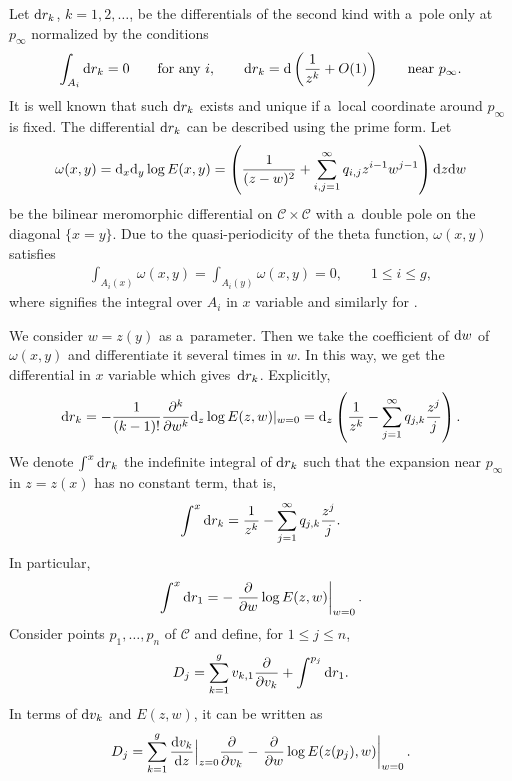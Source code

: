\documentclass[10pt,a4paper]{amsart}
\numberwithin{equation}{section}
\theoremstyle{definition}
\begin{document}
Let ${\rm d}r_k$, $k=1,2,\dots $, be the differentials of the second kind with a~pole
only at $p_\infty$ normalized by the conditions
\begin{gather*}
\int_{A_i} {\rm d}r_k=0\qquad \text{for any $i$},
\qquad
{\rm d}r_k={\rm d}\left(\frac{1}{z^k}+O(1)\right) \qquad \text{near $p_\infty$}.
\end{gather*}
It is well known that such ${\rm d}r_k$ exists and unique if a~local coordinate around $p_\infty$ is fixed. The differential ${\rm d}r_k$ can be described using the prime form.
Let
\begin{gather*}
\omega(x,y)={\rm d}_x{\rm d}_y\log E(x,y)=\left( \frac{1}{(z-w)^2}+\sum_{i,j=1}^\infty q_{i,j}z^{i-1}w^{j-1}\right){\rm d}z{\rm d}w
\end{gather*}
be the bilinear meromorphic differential on ${\mathcal C}\times {\mathcal C}$ with a~double pole
on the diagonal $\{x=y\}$.
Due to the quasi-periodicity of the theta function, $\omega(x,y)$ satisfies
\begin{gather*}
\int_{A_i(x)}\omega(x,y)=\int_{A_i(y)}\omega(x,y)=0,
\qquad
1\leq i\leq g,
\end{gather*}
where  signifies the integral over $A_i$ in $x$ variable and similarly
for .

We consider $w=z(y)$ as a~parameter.
Then we take the coefficient of ${\rm d}w$ of $\omega(x,y)$ and differentiate it several times in $w$.
In this way, we get the differential in $x$ variable which gives~${\rm d}r_k$. Explicitly,
\begin{gather}
{\rm d}r_k=-\frac{1}{(k-1)!}\frac{\partial^{k}}{\partial w^{k}}{\rm d}_z\log E(z,w)\vert_{w=0}
={\rm d}_z\left(\frac{1}{z^k}-\sum_{j=1}^\infty q_{j,k}\frac{z^j}{j}\right).
\label{drk-prime form}
\end{gather}
We denote $ \int^{x}{\rm d}r_k$ the indefinite integral of ${\rm d}r_k$ such that
the expansion near $p_\infty$ in $z=z(x)$ has no constant term, that is,
\[
\int^x {\rm d}r_k=\frac{1}{z^k}-\sum_{j=1}^\infty q_{j,k}\frac{z^j}{j}.
\]
In particular, \[
\int^x {\rm d}r_1=-\left.\frac{\partial}{\partial w}\log E(z,w)\right|_{w=0}.
\]
Consider points $p_1,\dots ,p_n$ of ${\mathcal C}$ and define, for $1\leq j\leq n$,
\begin{gather}
D_j
=\sum_{k=1}^g v_{k,1}\frac{\partial}{\partial v_k}+\int^{p_j} {\rm d}r_1.
\label{Dj-1}
\end{gather}
In terms of ${\rm d}v_k$ and $E(z,w)$, it can be written as
\begin{gather}
D_j=\sum_{k=1}^g \frac{{\rm d}v_k}{{\rm d}z}\Big|_{z=0}\frac{\partial}{\partial v_k}
-\left.\frac{\partial}{\partial w}\log E(z(p_j),w)\right|_{w=0}.
\label{Dj-2}
\end{gather}
\end{document}
